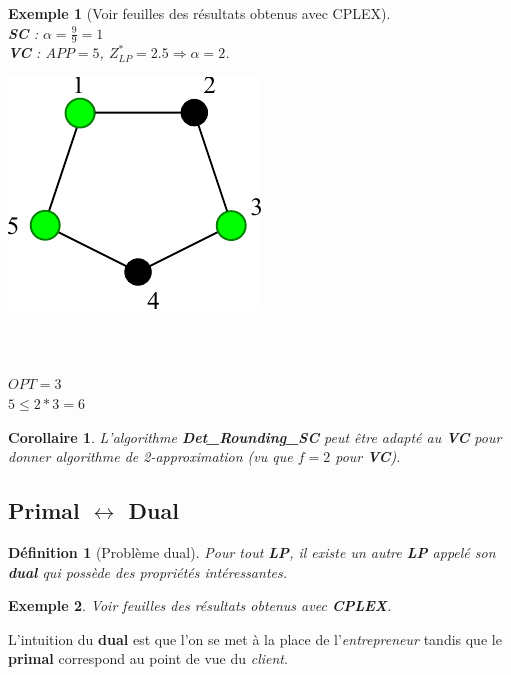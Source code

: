 \documentclass[12pt]{article}
\newcommand{\titre}[1]{\textcolor{title}{#1}}
\newtheorem{de}{D\'efinition}[section]
\newtheorem{exemple}{Exemple}[section]
\newtheorem{corollaire}{Corollaire}[section]
\begin{document}
\begin{exemple}[Voir feuilles des résultats obtenus avec CPLEX]$ $\\
\textbf{\titre{SC}} : $\alpha = \frac{9}{9} = 1$ \\
\textbf{\titre{VC}} : $APP = 5$, $Z^*_{LP} = 2.5 \Rightarrow \alpha = 2$. \\
\begin{multicols}{2}
\includegraphics[scale=1]{vcSol.pdf}
$ $\\$ $\\$ $\\$ $\\
$OPT = 3$\\
$5 \leq 2*3=6$
\end{multicols}
\end{exemple}

\begin{corollaire}
L'algorithme \textbf{Det\_Rounding\_SC} peut être adapté au \textbf{\titre{VC}}
pour donner algorithme de 2-approximation (vu que $f = 2$ pour
\textbf{\titre{VC}}).
\end{corollaire}

\subsection{Primal $\leftrightarrow$ Dual}

\begin{de}[Problème dual]
Pour tout \textbf{\titre{LP}}, il existe un autre \textbf{\titre{LP}} appelé son
\textbf{dual} qui possède des propriétés intéressantes.
\end{de}

\begin{exemple}
Voir feuilles des résultats obtenus avec \textbf{CPLEX}.
\end{exemple}

L'intuition du \textbf{dual} est que l'on se met à la place de
l'\textit{entrepreneur} tandis que le \textbf{primal} correspond au point de vue
du \textit{client}. \\
\end{document}
